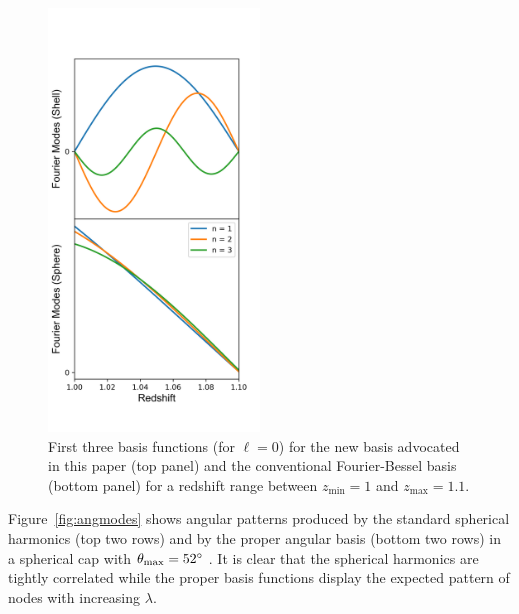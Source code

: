 \documentclass[fleqn,usenatbib]{mnras}
\begin{document}
\begin{figure}
\includegraphics[clip,trim={0 1.2cm 0 1.5cm}, width=0.5\textwidth]{radial_modes.png}
\caption{First three basis functions (for $\ell = 0$) for the new basis
advocated in this paper (top panel) and the conventional Fourier-Bessel basis
(bottom panel) for a redshift range between $z_\mathrm{min} = 1$ and
$z_\mathrm{max} = 1.1$.}
\label{fig:radmods}
\end{figure}

Figure~\ref{fig:angmodes} shows angular patterns produced by the standard
spherical harmonics (top two rows) and by the proper angular basis (bottom two
rows) in a spherical cap with $\theta_\mathrm{max} = 52\degree$ \citep[roughly
the size of the BOSS CMASS North footprint,][]{2013AJ....145...10D}. It is clear
that the spherical harmonics are tightly correlated while the proper basis
functions display the expected pattern of nodes with increasing $\lambda$.
\end{document}
